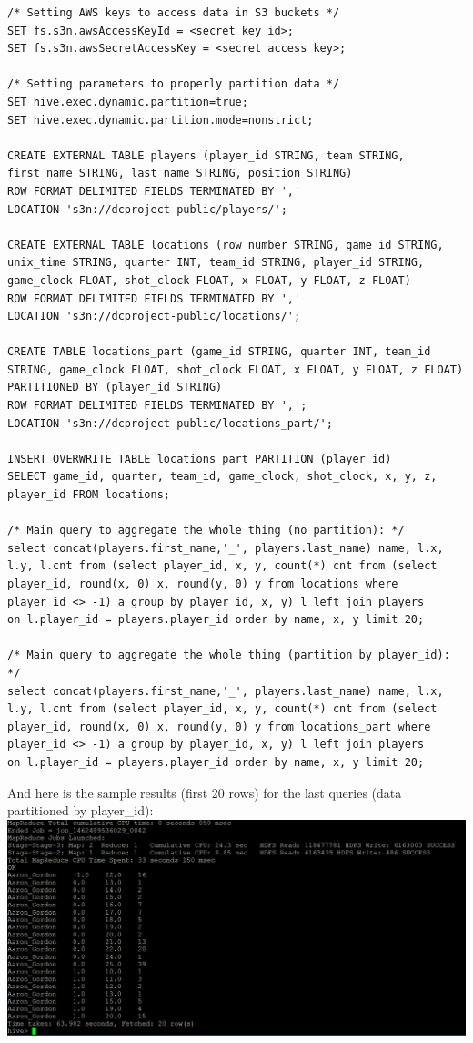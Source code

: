 \documentclass[11pt]{article}
\begin{document}
\begin{lstlisting}
/* Setting AWS keys to access data in S3 buckets */
SET fs.s3n.awsAccessKeyId = <secret key id>;
SET fs.s3n.awsSecretAccessKey = <secret access key>;

/* Setting parameters to properly partition data */
SET hive.exec.dynamic.partition=true;  
SET hive.exec.dynamic.partition.mode=nonstrict; 

CREATE EXTERNAL TABLE players (player_id STRING, team STRING, 
first_name STRING, last_name STRING, position STRING)
ROW FORMAT DELIMITED FIELDS TERMINATED BY ','
LOCATION 's3n://dcproject-public/players/';

CREATE EXTERNAL TABLE locations (row_number STRING, game_id STRING, 
unix_time STRING, quarter INT, team_id STRING, player_id STRING, 
game_clock FLOAT, shot_clock FLOAT, x FLOAT, y FLOAT, z FLOAT)
ROW FORMAT DELIMITED FIELDS TERMINATED BY ','
LOCATION 's3n://dcproject-public/locations/';

CREATE TABLE locations_part (game_id STRING, quarter INT, team_id 
STRING, game_clock FLOAT, shot_clock FLOAT, x FLOAT, y FLOAT, z FLOAT)
PARTITIONED BY (player_id STRING)
ROW FORMAT DELIMITED FIELDS TERMINATED BY ',';
LOCATION 's3n://dcproject-public/locations_part/';

INSERT OVERWRITE TABLE locations_part PARTITION (player_id)
SELECT game_id, quarter, team_id, game_clock, shot_clock, x, y, z, 
player_id FROM locations;

/* Main query to aggregate the whole thing (no partition): */
select concat(players.first_name,'_', players.last_name) name, l.x, 
l.y, l.cnt from (select player_id, x, y, count(*) cnt from (select 
player_id, round(x, 0) x, round(y, 0) y from locations where 
player_id <> -1) a group by player_id, x, y) l left join players 
on l.player_id = players.player_id order by name, x, y limit 20;

/* Main query to aggregate the whole thing (partition by player_id): */
select concat(players.first_name,'_', players.last_name) name, l.x, 
l.y, l.cnt from (select player_id, x, y, count(*) cnt from (select 
player_id, round(x, 0) x, round(y, 0) y from locations_part where 
player_id <> -1) a group by player_id, x, y) l left join players 
on l.player_id = players.player_id order by name, x, y limit 20;
\end{lstlisting}

And here is the sample results (first 20 rows) for the last queries (data partitioned by player\_id):\\

\includegraphics{results_hive_partition_player_id.PNG}
\end{document}
